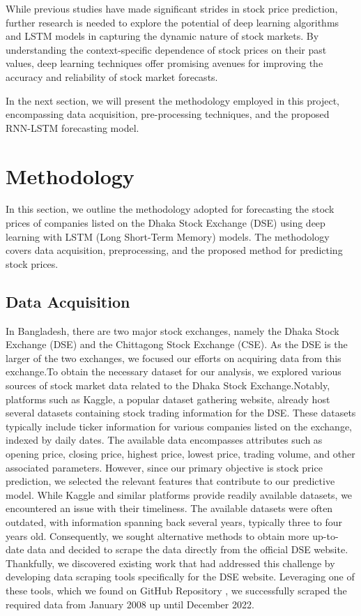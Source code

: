 \documentclass[conference]{IEEEtran}
\begin{document}
While previous studies have made significant strides in stock price prediction, further research is needed to explore the potential of deep learning algorithms and LSTM models in capturing the dynamic nature of stock markets. By understanding the context-specific dependence of stock prices on their past values, deep learning techniques offer promising avenues for improving the accuracy and reliability of stock market forecasts.

In the next section, we will present the methodology employed in this project, encompassing data acquisition, pre-processing techniques, and the proposed RNN-LSTM forecasting model.

\section{Methodology}
In this section, we outline the methodology adopted for forecasting the stock prices of companies listed on the Dhaka Stock Exchange (DSE) using deep learning with LSTM (Long Short-Term Memory) models. The methodology covers data acquisition, preprocessing, and the proposed method for predicting stock prices.

\subsection{Data Acquisition}
In Bangladesh, there are two major stock exchanges, namely the Dhaka Stock Exchange (DSE) and the Chittagong Stock Exchange (CSE). As the DSE is the larger of the two exchanges, we focused our efforts on acquiring data from this exchange.To obtain the necessary dataset for our analysis, we explored various sources of stock market data related to the Dhaka Stock Exchange.Notably, platforms such as Kaggle, a popular dataset gathering website, already host several datasets containing stock trading information for the DSE. These datasets typically include ticker information for various companies listed on the exchange, indexed by daily dates. The available data encompasses attributes such as opening price, closing price, highest price, lowest price, trading volume, and other associated parameters. However, since our primary objective is stock price prediction, we selected the relevant features that contribute to our predictive model.
While Kaggle and similar platforms provide readily available datasets, we encountered an issue with their timeliness. The available datasets were often outdated, with information spanning back several years, typically three to four years old. Consequently, we sought alternative methods to obtain more up-to-date data and decided to scrape the data directly from the official DSE website. Thankfully, we discovered existing work that had addressed this challenge by developing data scraping tools specifically for the DSE website. Leveraging one of these tools, which we found on GitHub Repository \cite{bdstockexchange}, we successfully scraped the required data from January 2008 up until December 2022.
\end{document}
